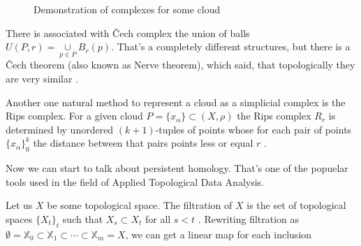 \documentclass[a4paper, 12pt]{article}
\begin{document}
\begin{figure}[h!]
\begin{minipage}[h]{0.5\linewidth}
\end{minipage}
\begin{minipage}[h]{0.5\linewidth}
\end{minipage}
\caption{Demonstration of complexes for some cloud}
\label{image1}
\end{figure}
\par There is associated with Čech complex the union of balls $U(P, r) = \underset{{p\in P}}{\cup}B_r(p)$. That's a completely different structures, but there is a Čech theorem (also known as Nerve theorem), which said, that topologically they are very similar \cite{ghrist}\cite{karol}.
\par Another one natural method to represent a cloud as a simplicial complex is the Rips complex. For a given cloud $P = \{x_\alpha\}\subset (X, \rho)$ the Rips complex $R_r$ is determined by unordered $(k+1)$-tuples of points whose for each pair of points $\{x_\alpha\}_0^k$ the distance between that pairs points less or equal $r$ \cite{ghrist}.
\par Now we can start to talk about persistent homology. That's one of the popuelar tools used in the field of Applied Topological Data Analysis.
\par Let us $X$ be some topological space. The filtration of $X$ is the set of topological spaces $\{X_t\}_t$ such that $X_s \subset X_t$ for all $s < t$ \cite{bobprimoz}. Rewriting filtration as $\emptyset = \mathbb{X}_0 \subset \mathbb{X}_1 \subset \cdots \subset \mathbb{X}_m = X$, we can get a linear map for each inclusion
\end{document}
